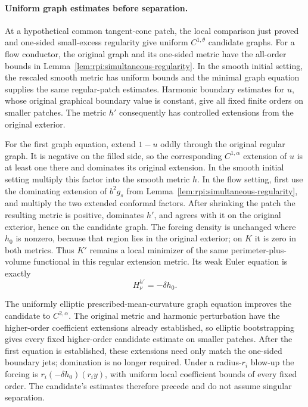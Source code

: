 \paragraph{Uniform graph estimates before separation.}
At a hypothetical common tangent-cone patch, the local comparison just
proved and one-sided small-excess regularity give uniform
$C^{1,\theta}$ candidate graphs.
For a flow conductor, the original graph and its one-sided metric
have the all-order bounds in
Lemma~\ref{lem:rpi:simultaneous-regularity}. In the smooth initial
setting, the rescaled smooth metric has uniform bounds and the
minimal graph equation supplies the same regular-patch estimates.
Harmonic boundary estimates for $u$, whose original graphical
boundary value is constant, give all fixed finite orders on smaller
patches. The metric $h'$ consequently has controlled extensions
from the original exterior.

For the first graph equation, extend $1-u$ oddly through the original
regular graph. It is negative on the filled side, so the corresponding
$C^{1,\alpha}$ extension of $u$ is at least one there and dominates
its original extension. In the smooth initial setting multiply this
factor into the smooth metric $h$. In the flow setting, first use the
dominating extension of $b^2g_s$ from
Lemma~\ref{lem:rpi:simultaneous-regularity}, and multiply the two
extended conformal factors. After shrinking the patch the resulting
metric is positive, dominates $h'$, and agrees with it on the original
exterior, hence on the candidate graph.
The forcing density is unchanged where $h_0$ is nonzero, because
that region lies in the original exterior; on $K$ it is zero in
both metrics. Thus $K'$ remains a local minimizer of the same
perimeter-plus-volume functional in this regular extension metric.
Its weak Euler equation is exactly
\[
 H_{\nu}^{h'}=-\delta h_0.
\]

The uniformly elliptic prescribed-mean-curvature graph equation
improves the candidate to $C^{2,\alpha}$. The original metric and
harmonic perturbation have the higher-order coefficient extensions
already established, so elliptic bootstrapping gives every fixed
higher-order candidate estimate on smaller patches. After the first
equation is established, these extensions need only match the
one-sided boundary jets; domination is no longer required.
Under a radius-$r_i$ blow-up the forcing is
$r_i(-\delta h_0)(r_i y)$, with uniform local coefficient bounds
of every fixed order. The candidate's estimates therefore precede
and do not assume singular separation.

